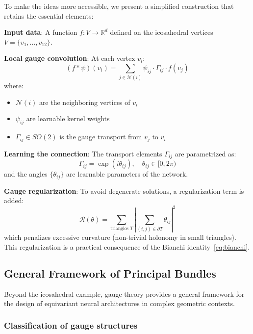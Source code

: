 \begin{theorem}
To make the ideas more accessible, we present a simplified construction that retains the essential elements:

\textbf{Input data}: A function $f: V \to \mathbb{R}^d$ defined on the icosahedral vertices $V = \{v_1, \ldots, v_{12}\}$.

\textbf{Local gauge convolution}: At each vertex $v_i$:
\begin{equation}
(f * \psi)(v_i) = \sum_{j \in \mathcal{N}(i)} \psi_{ij} \cdot \Gamma_{ij} \cdot f(v_j)
\end{equation}
where:
\begin{itemize}
    \item $\mathcal{N}(i)$ are the neighboring vertices of $v_i$
    \item $\psi_{ij}$ are learnable kernel weights
    \item $\Gamma_{ij} \in SO(2)$ is the gauge transport from $v_j$ to $v_i$
\end{itemize}

\textbf{Learning the connection}: The transport elements $\Gamma_{ij}$ are parametrized as:
\begin{equation}
\Gamma_{ij} = \exp(i\theta_{ij}), \quad \theta_{ij} \in [0, 2\pi)
\end{equation}
and the angles $\{\theta_{ij}\}$ are learnable parameters of the network.

\textbf{Gauge regularization}: To avoid degenerate solutions, a regularization term is added:
\begin{equation}
\mathcal{R}(\theta) = \sum_{\text{triangles } T} \left|\sum_{(i,j) \in \partial T} \theta_{ij}\right|^2
\end{equation}
which penalizes excessive curvature (non-trivial holonomy in small triangles). This regularization is a practical consequence of the Bianchi identity~\eqref{eq:bianchi}.
\end{theorem}

\subsection{General Framework of Principal Bundles}

Beyond the icosahedral example, gauge theory provides a general framework for the design of equivariant neural architectures in complex geometric contexts.

\subsubsection{Classification of gauge structures}

